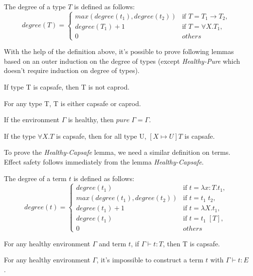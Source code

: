 \begin{definition}
  The degree of a type $T$ is defined as follows:
  \begin{equation*}
    degree(T) =
    \begin{cases}
      max(degree(t_1), degree(t_2)) & \text{if } T = T_1 \to T_2,\\
      degree(T_1) + 1 & \text{if } T = \forall X.T_1,\\
      0 & others
    \end{cases}
  \end{equation*}
\end{definition}

With the help of the definition above, it's possible to prove
following lemmas based on an outer induction on the degree of types
(except \emph{Healthy-Pure} which doesn't require induction on degree
of types).

\begin{lemma}
 If type T is capsafe, then T is not caprod.
\end{lemma}

\begin{lemma}
 For any type T, T is either capsafe or caprod.
\end{lemma}

\begin{lemma}
  If the environment $\Gamma$ is healthy, then $pure \; \Gamma = \Gamma$.
\end{lemma}

\begin{lemma}
 If the type $\forall X.T$ is capsafe, then for all type U,  $[X
 \mapsto U]T$ is capsafe.
\end{lemma}

To prove the \emph{Healthy-Capsafe} lemma, we need a similar
definition on terms. Effect safety follows immediately from the lemma
\emph{Healthy-Capsafe}.

\begin{definition}
  The degree of a term $t$ is defined as follows:
  \begin{equation*}
    degree(t) =
    \begin{cases}
      degree(t_1) & \text{if } t = \lambda x:T.t_1,\\
      max(degree(t_1), degree(t_2)) & \text{if } t = t_1 \; t_2,\\
      degree(t_1) + 1 & \text{if } t = \lambda X.t_1,\\
      degree(t_1) & \text{if } t = t_1 \; [T],\\
      0 & others
    \end{cases}
  \end{equation*}
\end{definition}

\begin{lemma}
 For any healthy environment $\Gamma$ and term $t$, if $\Gamma \vdash t
 : T$, then T is capsafe.
\end{lemma}

\begin{theorem}
  For any healthy environment $\Gamma$, it's impossible to construct a
  term $t$ with $\Gamma \vdash t : E$.
\end{theorem}
